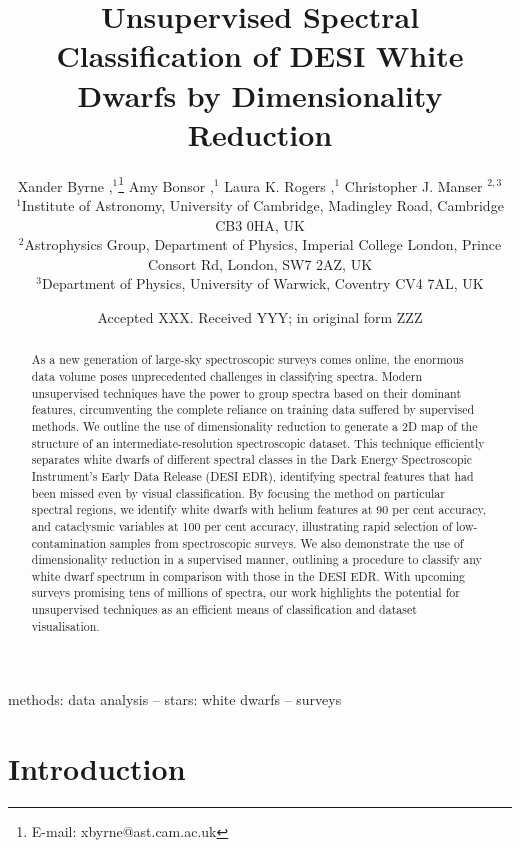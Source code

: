 \documentclass[fleqn,usenatbib]{mnras}
\title[
    Unsupervised WD Spectral Classification
]{
    Unsupervised Spectral Classification of DESI White Dwarfs by Dimensionality Reduction
}
\author[
    X. Byrne et al.
]{
    Xander Byrne
    \orcidlink{0000-0001-9488-238X},$^{1}$\thanks{E-mail: xbyrne@ast.cam.ac.uk}
    Amy Bonsor
    \orcidlink{0000-0002-8070-1901},$^{1}$
    Laura K. Rogers
    \orcidlink{0000-0002-3553-9474},$^{1}$
    Christopher J. Manser
    \orcidlink{0000-0003-1543-5405}$^{2,3}$
\\
$^{1}$Institute of Astronomy,
University of Cambridge,
Madingley Road,
Cambridge CB3 0HA,
UK\\
$^{2}$Astrophysics Group,
Department of Physics,
Imperial College London,
Prince Consort Rd,
London,
SW7 2AZ,
UK\\
$^{3}$Department of Physics,
University of Warwick,
Coventry CV4 7AL,
UK
}
\date{Accepted XXX. Received YYY; in original form ZZZ}
\begin{document}
\label{firstpage}
\pagerange{\pageref{firstpage}--\pageref{lastpage}}
\maketitle

\begin{abstract}
As a new generation of large-sky spectroscopic surveys comes online, the enormous data volume poses unprecedented challenges in classifying spectra. 
Modern unsupervised techniques have the power to group spectra based on their dominant features, circumventing the complete reliance on training data suffered by supervised methods.
We outline the use of dimensionality reduction to generate a 2D map of the structure of an intermediate-resolution spectroscopic dataset.
This technique efficiently separates white dwarfs of different spectral classes in the Dark Energy Spectroscopic Instrument's Early Data Release (DESI EDR), identifying spectral features that had been missed even by visual classification.
By focusing the method on particular spectral regions, we identify white dwarfs with helium features at 90 per cent accuracy, and cataclysmic variables at 100 per cent accuracy, illustrating rapid selection of low-contamination samples from spectroscopic surveys.
We also demonstrate the use of dimensionality reduction in a supervised manner, outlining a procedure to classify any white dwarf spectrum in comparison with those in the DESI EDR.
With upcoming surveys promising tens of millions of spectra, our work highlights the potential for unsupervised techniques as an efficient means of classification and dataset visualisation.
\end{abstract}

\begin{keywords}
methods: data analysis -- stars: white dwarfs -- surveys
\end{keywords}



\section{Introduction}
\end{document}
